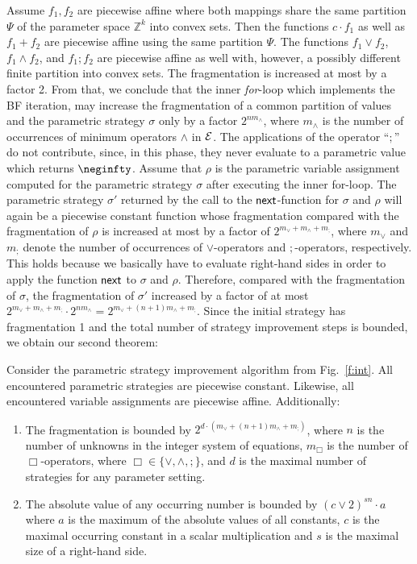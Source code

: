 \documentclass[a4paper]{easychair}
\newcommand{\ZZ}{\mathbb{Z}}
\begin{document}
Assume $f_1,f_2$ are piecewise affine where both mappings share the same partition $\Psi$ of the
parameter space $\ZZ^k$ into convex sets. 
Then the functions $c\cdot f_1$ as well as $f_1+f_2$
are piecewise affine using the same partition $\Psi$. 
The functions $f_1 \vee f_2$, $f_1 \wedge f_2$, and $f_1;f_2$
are piecewise affine as well with, however, a possibly different finite partition into
convex sets. 
The fragmentation is increased at most by a factor 2.
From that, we conclude that the inner \emph{for}-loop which implements the BF iteration,
may increase the fragmentation of a common partition of values and the parametric strategy $\sigma$
only by a factor $2^{nm_\wedge}$, 
where $m_\wedge$ is the number of occurrences of minimum operators $\wedge$ in $\cal E$.
The applications of the operator ``$;$'' do not contribute, since, in this phase, they never evaluate to a 
parametric value which returns $\neginfty$.
Assume that $\rho$ is the parametric variable assignment computed for 
the parametric strategy $\sigma$ after executing the inner for-loop.
The parametric strategy $\sigma'$ returned by the call to the
${\sf next}$-function for $\sigma$ and $\rho$ will again be a piecewise constant function
whose fragmentation compared with the fragmentation of $\rho$ is increased at most by a factor of 
$2^{m_\vee + m_\wedge + m_;}$,
where $m_\vee$ and $m_;$ denote the number of occurrences of $\vee$-operators and $;$-operators,
respectively.
This holds because we basically have to evaluate right-hand sides in order to 
apply the function $\sf next$ to $\sigma$ and $\rho$.
Therefore, 
compared with the fragmentation of $\sigma$,
the fragmentation of $\sigma'$ increased by a factor of at most 
$2^{m_\vee + m_\wedge + m_;} \cdot 2^{n m_\wedge} = 2^{m_\vee + (n + 1) m_\wedge + m_;}$.
Since the initial strategy has fragmentation 1 and the total number of strategy improvement steps is
bounded, we obtain our second theorem:

\begin{theorem}\label{t:fragmentation}
Consider the parametric strategy improvement algorithm from Fig.\ \ref{f:int}.
All encountered parametric strategies are piecewise constant.
Likewise, all encountered variable assignments are piecewise affine.
Additionally:
\begin{enumerate}
\item	The fragmentation is bounded by $2^{d \cdot (m_\vee + (n + 1) m_\wedge + m_;)}$,
where 
$n$ is the number of unknowns in the integer system of equations,
$m_\Box$ is the number of $\Box$-operators, where $\Box \in \{\vee,\wedge,;\}$, and
$d$ is the maximal number of strategies for any parameter setting. \item	The absolute value of any occurring number 
is bounded by
	$(c\vee 2)^{s n} \cdot a$ where 
	$a$ is the maximum of the absolute values of all constants, 
	$c$ is the maximal occurring constant in a scalar multiplication and 
	$s$ is the maximal size of a right-hand side.
\end{enumerate}
\end{theorem}
\end{document}
